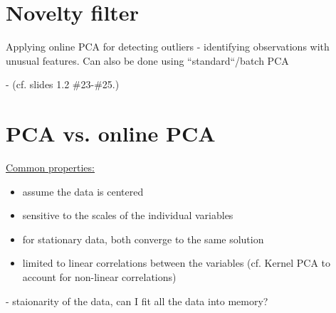 \newpage

\section{Novelty filter}

Applying online PCA for detecting outliers - identifying observations with unusual features. 
Can also be done using ``standard``/batch PCA




- (cf. slides 1.2 \#23-\#25.)

\section{PCA vs. online PCA}

\underline{Common properties:}

\begin{itemize}
\item assume the data is centered
\item sensitive to the scales of the individual variables
\item for stationary data, both converge to the same solution
\item limited to linear correlations between the variables (cf. Kernel PCA to account for non-linear correlations)
\end{itemize}


- staionarity of the data, can I fit all the data into memory?

